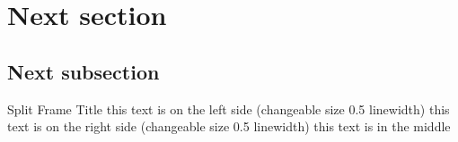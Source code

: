 \section{Next section}
\subsection{Next subsection}

\begin{splitframe}{0.5}{0.5}{Split Frame Title}
{this text is on the left side (changeable size 0.5 linewidth)}
{this text is on the right side (changeable size 0.5 linewidth)}
this text is in the middle
\end{splitframe}